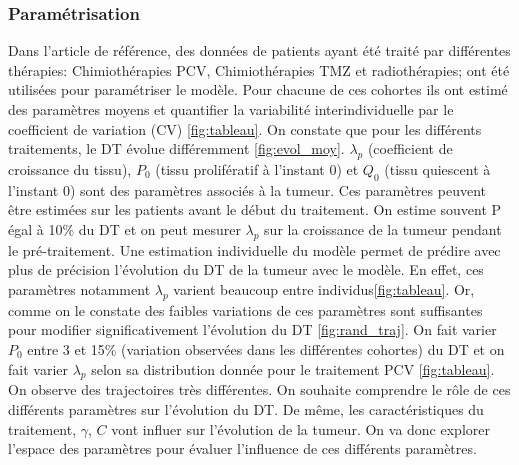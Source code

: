 \documentclass[12pt]{article}
\begin{document}
\subsubsection{Paramétrisation}
Dans l'article de référence, des données de patients ayant été traité par différentes thérapies: Chimiothérapies PCV, Chimiothérapies TMZ et radiothérapies; ont été utilisées pour paramétriser le modèle. Pour chacune de ces cohortes ils ont estimé des paramètres moyens et quantifier la variabilité interindividuelle par le coefficient de variation (CV) \ref{fig:tableau}.  On constate que pour les différents traitements, le DT évolue différemment \ref{fig:evol_moy}. $\lambda_{p}$ (coefficient de croissance du tissu), $P_{0}$ (tissu prolifératif à l'instant 0) et $Q_{0}$ (tissu quiescent à l'instant 0) sont des paramètres associés à la tumeur.  Ces paramètres peuvent être estimées sur les patients avant le début du traitement. On estime souvent P égal à 10\% du DT et on peut mesurer $\lambda_{p}$ sur la croissance de la tumeur pendant le pré-traitement. Une estimation individuelle du modèle permet de prédire avec plus de précision l'évolution du DT de la tumeur avec le modèle. En effet, ces paramètres notamment $\lambda_{p}$ varient beaucoup entre individus\ref{fig:tableau}. Or, comme on le constate des faibles variations de ces paramètres sont suffisantes pour modifier significativement  l'évolution du DT \ref{fig:rand_traj}. On fait varier $P_{0}$ entre 3 et 15\% (variation observées dans les différentes cohortes) du DT et on fait varier $\lambda_{p}$ selon sa distribution donnée pour le traitement PCV \ref{fig:tableau}. On observe des trajectoires très différentes.  On  souhaite comprendre le rôle de ces différents paramètres sur l'évolution du DT. De même, les caractéristiques du traitement, $\gamma$, $C$ vont influer sur l'évolution de la tumeur. On va donc explorer l'espace des paramètres pour évaluer l'influence de ces différents paramètres.  
\end{document}
